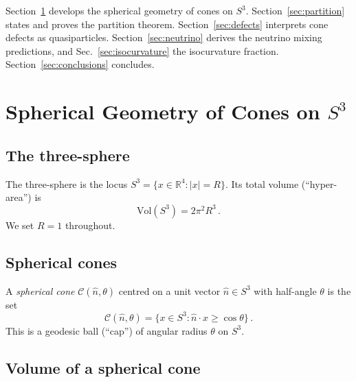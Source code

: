 \documentclass[amsmath,amssymb,aps,prd,twocolumn,superscriptaddress,nofootinbib]{revtex4-2}
\begin{document}
Section~\ref{sec:spherical} develops the spherical geometry of cones on $S^3$.
Section~\ref{sec:partition} states and proves the partition theorem.
Section~\ref{sec:defects} interprets cone defects as quasiparticles.
Section~\ref{sec:neutrino} derives the neutrino mixing predictions, and
Sec.~\ref{sec:isocurvature} the isocurvature fraction.
Section~\ref{sec:conclusions} concludes.

\section{Spherical Geometry of Cones on $S^3$}\label{sec:spherical}

\subsection{The three-sphere}

The three-sphere is the locus $S^3 = \{x \in \mathbb{R}^4 : |x| = R\}$.
Its total volume (``hyper-area'') is
\begin{equation}\label{eq:volS3}
  \mathrm{Vol}(S^3) = 2\pi^2 R^3\,.
\end{equation}
We set $R=1$ throughout.

\subsection{Spherical cones}

A \emph{spherical cone} $\mathcal{C}(\hat{n},\theta)$ centred on a unit vector
$\hat{n} \in S^3$ with half-angle $\theta$ is the set
\begin{equation}\label{eq:cone_def}
  \mathcal{C}(\hat{n},\theta)
  = \bigl\{x \in S^3 : \hat{n}\cdot x \geq \cos\theta\bigr\}\,.
\end{equation}
This is a geodesic ball (``cap'') of angular radius $\theta$ on $S^3$.

\subsection{Volume of a spherical cone}
\end{document}
